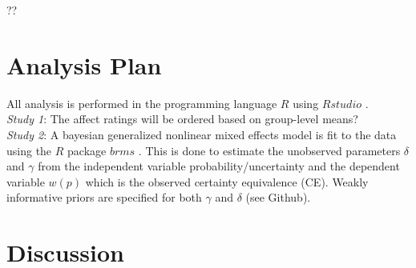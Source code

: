 \documentclass[12pt]{article}
\begin{document}
??

\section{Analysis Plan}

All analysis is performed in the programming
language $R$ \autocite{rcore} using $Rstudio$
\autocite{rstudio}. \\

\emph{Study 1}: The affect ratings will be
ordered based on group-level means? \\

\emph{Study 2}: A bayesian generalized nonlinear
mixed effects model is fit to the data using the
$R$ package $brms$ \autocite{brms}.
This is done to estimate the unobserved parameters
$\delta$ and $\gamma$ from the independent variable
probability/uncertainty and the dependent variable
$w(p)$ which is the observed certainty equivalence (CE).
Weakly informative priors are specified for both
$\gamma$ and $\delta$ (see Github).


\section{Discussion}

\printbibliography
\end{document}
